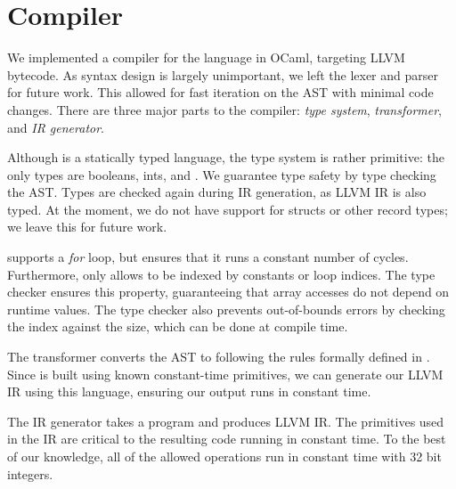 \section{Compiler}
\label{sec:implementation}

We implemented a compiler for the \constc language in OCaml, targeting LLVM bytecode. As syntax design is largely unimportant, we left the lexer and parser for future work. This allowed for fast iteration on the AST with minimal code changes. There are three major parts to the \constc compiler: \textit{type system}, \textit{transformer}, and \textit{IR generator}.

 Although \constc is a statically typed language, the type system is rather primitive: the only types are booleans, ints, and \bytearrays. We guarantee type safety by type checking the \constc AST. Types are checked again during IR generation, as LLVM IR is also typed. At the moment, we do not have support for structs or other record types; we leave this for future work.

\constc supports a \textit{for} loop, but ensures that it runs a constant number of cycles. Furthermore, \constc only allows \bytearrays to be indexed by constants or loop indices. The type checker ensures this property, guaranteeing that array accesses do not depend on runtime values. The type checker also prevents out-of-bounds errors by checking the index against the \bytearray size, which can be done at compile time.

 The transformer converts the \constc AST to \ccore following the rules formally defined in . Since \ccore is built using known constant-time primitives, we can generate our LLVM IR using this language, ensuring our output runs in constant time.

 The IR generator takes a \ccore program and produces LLVM IR. The primitives used in the IR are critical to the resulting code running in constant time. To the best of our knowledge, all of the allowed operations run in constant time with 32 bit integers.

\begin{comment}
\begin{figure}
        \centering
        \small
        \begin{tabularx}{\columnwidth}{lr}
        \toprule
        Label & Supported Operations\\
        \midrule
        Types &  Int/Bool/Byte Array \\
        Bitwise Op & Not/And/Or/Left Shift/Right Shift \\
        Arithmetic Op & Plus/Minus/Multiply \\
        Comparison Op & Equal/Not Equal/Greater Than/Greater Than or Equal \\
        & To/Less Than/Less Than or Equal To \\
        \bottomrule
        \end{tabularx}
        \caption{Types and operators supported in \constc.}
    \label{table:functions}
\end{figure}
\end{comment}
